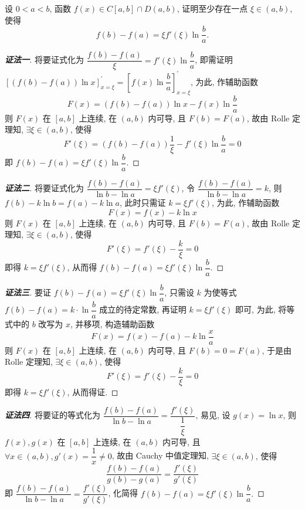 \begin{example}
    设 $0<a<b$, 函数 $f(x)\in C[a,b]\cap D(a,b)$, 证明至少存在一点 $\xi\in(a,b)$, 使得 $$f(b)-f(a)=\xi f'(\xi)\ln\dfrac{b}{a}.$$
\end{example}
\begin{proof}[{\songti \textbf{证法一}}]
    将要证式化为 $\dfrac{f(b)-f(a)}{\xi}=f'(\xi)\ln\dfrac{b}{a}$, 即需证明
    $\left[ \left( f(b)  -f(a)  \right) \ln x\right] _{x=\xi }^{'}=\left[ f(x)  \ln \dfrac{b}{a}\right] _{x=\xi }^{'}$, 
    为此, 作辅助函数 $$F(x)  =\left( f(b)  -f(a)  \right) \ln x-f(x)  \ln \dfrac{b}{a}$$
    则 $F(x)$ 在 $[a,b]$ 上连续, 在 $(a,b)$ 内可导, 且 $F(b)=F(a)$, 故由 Rolle 定理知, $\exists\xi\in(a,b)\text{, 使得 }$
    $$F'(\xi)=(f(b)-f(a))\dfrac{1}{\xi}-f'(\xi)\ln\dfrac{b}{a}=0$$
    即 $f(b)-f(a)=\xi f'(\xi)\ln\dfrac{b}{a}.$
\end{proof}
\begin{proof}[{\songti \textbf{证法二}}]
    将要证式化为 $\dfrac{f(b)  -f(a)  }{\ln b-\ln a}=\xi f'(\xi)  $, 
    令 $\dfrac{f(b)  -f(a)  }{\ln b-\ln a}=k$, 则 $f(b)-k\ln b=f(a)-k\ln a$, 此时只需证 $k=\xi f'(\xi)$, 
    为此, 作辅助函数 $$F(x)=f(x)-k\ln x$$ 则 $F(x)$ 在 $[a,b]$ 上连续, 在 $(a,b)$ 内可导, 且 $F(b)=F(a)$, 故由 Rolle 定理知, $\exists\xi\in(a,b)\text{, 使得 }$
    $$F'(\xi)=f'(\xi)-\dfrac{k}{\xi}=0$$
    即得 $k=\xi f'(\xi)$, 从而得 $f(b)-f(a)=\xi f'(\xi)\ln\dfrac{b}{a}.$
\end{proof}
\begin{proof}[{\songti \textbf{证法三}}]
    要证 $f(b)-f(a)=\xi f'(\xi)\ln\dfrac{b}{a}$, 只需设 $k$ 为使等式 $f(b)-f(a)=k\cdot\ln\dfrac{b}{a}$ 成立的待定常数, 再证明 $k=\xi f'(\xi)$ 即可, 
    为此, 将等式中的 $b$ 改写为 $x$, 并移项, 构造辅助函数
    $$F(x)=f(x)-f(a)-k\ln\dfrac{x}{a}$$
    则 $F(x)$ 在 $[a,b]$ 上连续, 在 $(a,b)$ 内可导, 且 $F(b)=0=F(a)$, 于是由 Rolle 定理知, $\exists\xi\in(a,b)\text{, 使得 }$
    $$F'(\xi)=f'(\xi)-\dfrac{k}{\xi}=0$$
    即得 $k=\xi f'(\xi)$, 从而得证.
\end{proof}
\begin{proof}[{\songti \textbf{证法四}}]
    将要证的等式化为 $\dfrac{f(b)-f(a)}{\ln b-\ln a}=\dfrac{f'(\xi)}{\dfrac{1}{\xi}}$, 易见, 设 $g(x)=\ln x$, 则
    $f(x),g(x)$ 在 $[a,b]$ 上连续, 在 $(a,b)$ 内可导, 且 $\forall x\in(a,b),g'(x)=\dfrac{1}{x}\neq0$, 故由 Cauchy 中值定理知, $\exists\xi\in(a,b)\text{, 使得 }$
    $$\dfrac{f(b)-f(a)}{g(b)-g(a)}=\dfrac{f'(\xi)}{g'(\xi)}$$
    即 $\dfrac{f(b)-f(a)}{\ln b-\ln a}=\dfrac{f'(\xi)}{g'(\xi)}$, 化简得 $f(b)-f(a)=\xi f'(\xi)\ln\dfrac{b}{a}.$
\end{proof}
